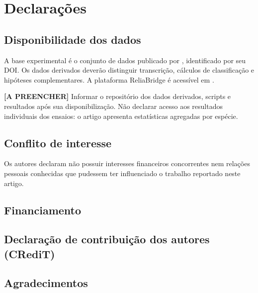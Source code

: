 \section*{Declarações}

\subsection*{Disponibilidade dos dados}

A base experimental é o conjunto de dados publicado por \textcite{DiasLahr2004}, identificado por seu DOI. Os dados derivados deverão distinguir transcrição, cálculos de classificação e hipóteses complementares. A plataforma ReliaBridge é acessível em \parencite{ReliaBridge2026}.

\begin{fillblock}
\noindent\textbf{[A PREENCHER]} Informar o repositório dos dados derivados, scripts e resultados após sua disponibilização. Não declarar acesso aos resultados individuais dos ensaios: o artigo apresenta estatísticas agregadas por espécie.
\end{fillblock}

\subsection*{Conflito de interesse}

Os autores declaram não possuir interesses financeiros concorrentes nem relações pessoais conhecidas que pudessem ter influenciado o trabalho reportado neste artigo.

\subsection*{Financiamento}


\subsection*{Declaração de contribuição dos autores (CRediT)}


\subsection*{Agradecimentos}

